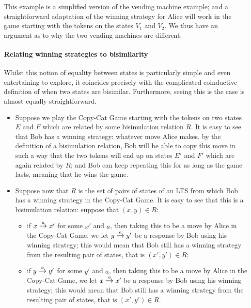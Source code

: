 \documentclass[sigconf]{acmart}
\newcommand{\gt}[1]{\stackrel{#1}{\mbox{\large$\rightarrow$}}}
\newcommand{\gta}{\gt{a}}
\begin{document}
This example is a simplified version of the vending machine example;
and a straightforward adaptation of the winning strategy for Alice
will work in the game starting with the tokens on the states $V_1$ and
$V_2$.  We thus have an argument as to why the two vending machines
are different.

\paragraph{Relating winning strategies to bisimilarity}
\newblock

Whilst this notion of equality between states is particularly simple
and even entertaining to explore, it coincides precisely with the
complicated coinductive definition of when two states are bisimilar.
Furthermore, seeing this is the case is almost equally
straightforward.

\begin{itemize}
\item
Suppose we play the Copy-Cat Game starting with the tokens on two
states $E$ and $F$ which are related by some bisimulation relation
$R$.  It is easy to see that Bob has a winning strategy: whatever move
Alice makes, by the definition of a bisimulation relation, Bob will be
able to copy this move in such a way that the two tokens will end up
on states $E'$ and $F'$ which are again related by $R$; and Bob can
keep repeating this for as long as the game lasts, meaning that he
wins the game.
\item
Suppose now that $R$ is the set of pairs of states of an LTS from
which Bob has a winning strategy in the Copy-Cat Game.  It is easy to
see that this is a bisimulation relation: suppose that $(x,y) \in R$:
\begin{itemize}
\item
if $x \gta x'$ for some $x'$ and $a$, then taking this to be a move by
Alice in the Copy-Cat Game, we let $y \gta y'$ be a response by Bob
using his winning strategy; this would mean that Bob still has a
winning strategy from the resulting pair of states, that is $(x',y')
\in R$;
\item
if $y \gta y'$ for some $y'$ and $a$, then taking this to be a move by
Alice in the Copy-Cat Game, we let $x \gta x'$ be a response by Bob
using his winning strategy; this would mean that Bob still has a
winning strategy from the resulting pair of states, that is $(x',y')
\in R$.
\end{itemize}
\end{itemize}
\end{document}
